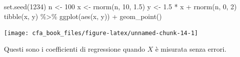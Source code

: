 \documentclass[
  11pt,
]{krantz}
\makeatletter
\newenvironment{Shaded}{\begin{snugshade}}{\end{snugshade}}
\newcommand{\AttributeTok}[1]{\textcolor[rgb]{0.61,0.61,0.61}{#1}}
\newcommand{\CommentTok}[1]{\textcolor[rgb]{0.37,0.37,0.37}{\textit{#1}}}
\newcommand{\DecValTok}[1]{\textcolor[rgb]{0.06,0.06,0.06}{#1}}
\newcommand{\FloatTok}[1]{\textcolor[rgb]{0.06,0.06,0.06}{#1}}
\newcommand{\FunctionTok}[1]{\textcolor[rgb]{0,0,0}{#1}}
\newcommand{\NormalTok}[1]{#1}
\newcommand{\OtherTok}[1]{\textcolor[rgb]{0.37,0.37,0.37}{#1}}
\newcommand{\SpecialCharTok}[1]{\textcolor[rgb]{0,0,0}{#1}}
\newenvironment{kframe}{%
\medskip{}
\setlength{\fboxsep}{.8em}
 \def\at@end@of@kframe{}%
 \ifinner\ifhmode%
  \def\at@end@of@kframe{\end{minipage}}%
  \begin{minipage}{\columnwidth}%
 \fi\fi%
 \def\FrameCommand##1{\hskip\@totalleftmargin \hskip-\fboxsep
 \colorbox{shadecolor}{##1}\hskip-\fboxsep
     \hskip-\linewidth \hskip-\@totalleftmargin \hskip\columnwidth}%
 \MakeFramed {\advance\hsize-\width
   \@totalleftmargin\z@ \linewidth\hsize
   \@setminipage}}%
 {\par\unskip\endMakeFramed%
 \at@end@of@kframe}
\renewenvironment{Shaded}{\begin{kframe}}{\end{kframe}}
\theoremstyle{definition}
\theoremstyle{definition}
\theoremstyle{definition}
\theoremstyle{definition}
\theoremstyle{remark}
\makeatother
\begin{document}
\begin{Shaded}
\begin{Highlighting}[]
\FunctionTok{set.seed}\NormalTok{(}\DecValTok{1234}\NormalTok{)}
\NormalTok{n }\OtherTok{\textless{}{-}} \DecValTok{100}
\NormalTok{x }\OtherTok{\textless{}{-}} \FunctionTok{rnorm}\NormalTok{(n, }\DecValTok{10}\NormalTok{, }\FloatTok{1.5}\NormalTok{)}
\NormalTok{y }\OtherTok{\textless{}{-}} \FloatTok{1.5} \SpecialCharTok{*}\NormalTok{ x }\SpecialCharTok{+} \FunctionTok{rnorm}\NormalTok{(n, }\DecValTok{0}\NormalTok{, }\DecValTok{2}\NormalTok{)}
\FunctionTok{tibble}\NormalTok{(x, y) }\SpecialCharTok{\%\textgreater{}\%}
  \FunctionTok{ggplot}\NormalTok{(}\FunctionTok{aes}\NormalTok{(x, y)) }\SpecialCharTok{+}
  \FunctionTok{geom\_point}\NormalTok{()}
\end{Highlighting}
\end{Shaded}

\begin{center}\texttt{[image: cfa\_book\_files/figure-latex/unnamed-chunk-14-1]} \end{center}

\begin{Shaded}
\end{Shaded}

Questi sono i coefficienti di regressione quando \(X\) è misurata senza errori.

\begin{Shaded}
\end{Shaded}
\end{document}
